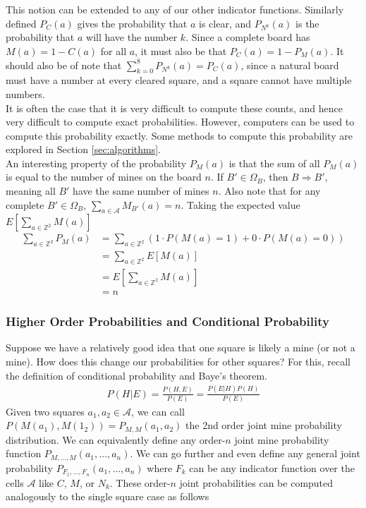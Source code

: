 This notion can be extended to any of our other indicator functions. Similarly defined $P_C(a)$ gives the probability that $a$ is clear, and $P_{N^k}(a)$ is the probability that $a$ will have the number $k$. Since a complete board has $M(a)=1-C(a)$ for all $a$, it must also be that $P_C(a)=1-P_M(a)$. It should also be of note that $\sum_{k=0}^8P_{N^k}(a)=P_C(a)$, since a natural board must have a number at every cleared square, and a square cannot have multiple numbers.\\

It is often the case that it is very difficult to compute these counts, and hence very difficult to compute exact probabilities. However, computers can be used to compute this probability exactly. Some methods to compute this probability are explored in Section \ref{sec:algorithms}.\\

An interesting property of the probability $P_M(a)$ is that the sum of all $P_M(a)$ is equal to the number of mines on the board $n$. If $B'\in\Omega_B$, then $B\Rightarrow B'$, meaning all $B'$ have the same number of mines $n$. Also note that for any complete $B'\in\Omega_B$, $\sum_{a\in\mathcal{A}}M_{B'}(a)=n$. Taking the expected value $E[\sum_{a\in\mathbb{Z}^2}M(a)]$
\begin{align*}
    \sum_{a\in\mathbb{Z}^2}P_M(a)&=\sum_{a\in\mathbb{Z}^2}(1\cdot P(M(a)=1)+0\cdot P(M(a)=0))\\
    &=\sum_{a\in\mathbb{Z}^2}E[M(a)]\\
    &=E\left[\sum_{a\in\mathbb{Z}^2}M(a)\right]\\
    &=n
\end{align*}

\subsubsection*{Higher Order Probabilities and Conditional Probability}

Suppose we have a relatively good idea that one square is likely a mine (or not a mine). How does this change our probabilities for other squares? For this, recall the definition of conditional probability and Baye's theorem.
\begin{align*}
    P(H|E)=\frac{P(H,E)}{P(E)}=\frac{P(E|H)P(H)}{P(E)}
\end{align*}
Given two squares $a_1,a_2\in\mathcal{A}$, we can call $P(M(a_1),M(1_2))=P_{M,M}(a_1,a_2)$ the 2nd order joint mine probability distribution. We can equivalently define any order-$n$ joint mine probability function $P_{M,\dots,M}(a_1,\dots,a_n)$. We can go further and even define any general joint probability $P_{F_1,\dots,F_n}(a_1,\dots,a_n)$ where $F_k$ can be any indicator function over the cells $\mathcal{A}$ like $C$, $M$, or $N_k$. These order-$n$ joint probabilities can be computed analogously to the single square case as follows


